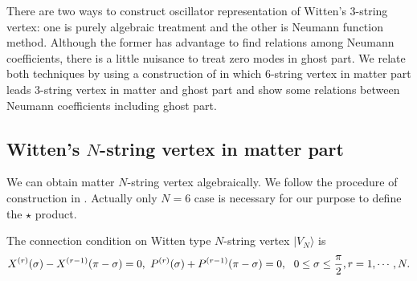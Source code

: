 \documentclass[12pt,a4paper]{article}
\begin{document}
There are two ways to construct oscillator representation of Witten's 3-string vertex: one is purely algebraic treatment and the other is Neumann function method. Although the former has advantage to find relations among Neumann coefficients, there is a little nuisance to treat zero modes in ghost part. We relate both techniques by using a construction of \cite{IOS} in which 6-string vertex in matter part leads 3-string vertex in matter and ghost part and show some relations between Neumann coefficients including ghost part.

\subsection{Witten's $N$-string vertex in matter part \label{sec:GJN}}

We can obtain matter $N$-string vertex algebraically.
We follow the procedure of construction in \cite{GJ(I)}.
Actually only $N=6$ case is necessary for our purpose to define the $\star$ product.

The connection condition on Witten type $N$-string vertex $|V_N\rangle$ is
\begin{equation}
\label{eqn:OLX}
X^{(r)}(\sigma)-X^{(r-1)}(\pi-\sigma)=0,\ P^{(r)}(\sigma)+P^{(r-1)}(\pi-\sigma)=0,\ \ 0\leq\sigma\leq{\pi\over2},r=1,\cdots,N.
\end{equation}
\end{document}
